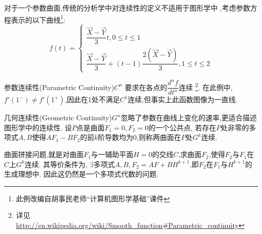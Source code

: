 	对于一个参数曲面,传统的分析学中对连续性的定义不适用于图形学中
	,考虑参数方程表示的以下曲线\footnote{此例改编自胡事民老师``计算机图形学基础''课件}:
	\[  f(t) = \begin{cases} \dfrac{\overrightarrow X - \overrightarrow Y}{3}t,0\le t \le 1 \\
		\dfrac{\overrightarrow X - \overrightarrow Y}{3} + (t-1)\dfrac{2(\overrightarrow X - \overrightarrow Y)}{3},1 \le t \le 2
	\end{cases}\]

	参数连续性(Parametric Continuity)$ C^n $ 要求在各点的$ \dfrac{d^n f}{dt^n}$连续
	\footnote{详见\url{http://en.wikipedia.org/wiki/Smooth_function\#Parametric_continuity}}.
	在此例中,$ f'(1^-) \ne f'(1^+)$,因此在1处不满足$ C^1$连续,但事实上此函数图像为一直线.

	几何连续性(Geometric Continuity)$ G^n$忽略了参数在曲线上变化的速率,更适合描述图形学中的连续性.
	设$ P$点是曲面$ F_1 = 0, F_2 = 0$的一个公共点,
	若存在$ P$处非零的多项式$ A,B$使得$ AF_1-BF_2$的前$ k$阶导数均为0,则称两曲面在$ P$处$ G^k$连续.

	曲面拼接问题,就是对曲面$ F_1$与一辅助平面$ H=0$的交线$ C$,求曲面$ F_2$,使得$ F_2$与$ F_1$在$ C$上$ G^k$连续.
	其等价条件为, $ \exists \texttt{多项式}A,B,F_2 = AF + BH^{k+1}$,即$ F_2$在$ F_1$与$ H^{k+1}$的生成理想中\cite{warren}.
	因此这仍然是一个多项式代数的问题.
